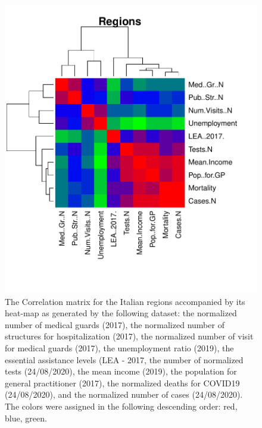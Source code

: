 \documentclass[
12pt, %
a4paper, %
oneside, %
headinclude,footinclude, %
BCOR5mm, %
]{scrartcl}
\begin{document}
\begin{figure}[h]
\begin{center}
\includegraphics[scale=1]{Pic/Regions_CorrMatrix.pdf}
\caption{The Correlation matrix for the Italian regions accompanied by its heat-map as generated by the following dataset: the normalized number of medical guards (2017), the normalized number of structures for hospitalization (2017), the normalized number of visit for medical guards (2017), the unemployment ratio (2019), the essential assistance levels (LEA - 2017, the number of normalized tests (24/08/2020), the mean income (2019), the population for general practitioner  (2017), the normalized deaths for COVID19 (24/08/2020), and the normalized number of cases (24/08/2020). The colors were assigned in the following descending order: red, blue, green. }
\label{Regions_CorrMatrix}
\end{center}
\end{figure}
\end{document}
